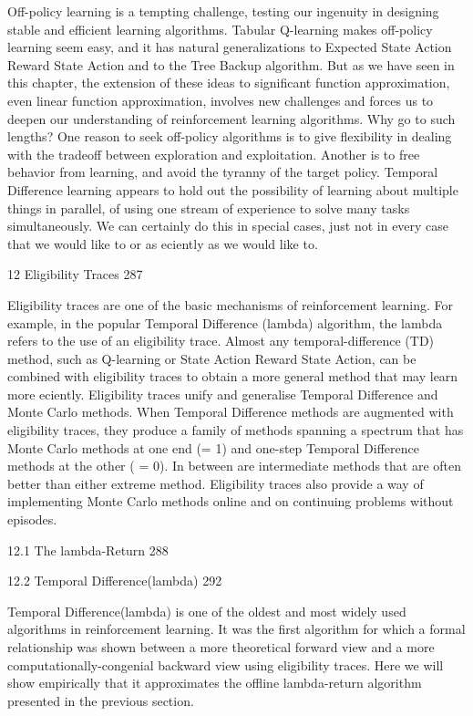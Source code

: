 Off-policy learning is a tempting challenge, testing our ingenuity in designing stable and efficient learning algorithms. Tabular Q-learning makes off-policy learning seem easy, and it has natural generalizations to Expected State Action Reward State Action and to the Tree Backup algorithm. But as we have seen in this chapter, the extension of these ideas to significant function approximation, even linear function approximation, involves new challenges and forces us to deepen our understanding of reinforcement learning algorithms. Why go to such lengths? One reason to seek off-policy algorithms is to give flexibility in dealing with the tradeoff between exploration and exploitation. Another is to free behavior from learning, and avoid the tyranny of the target policy. Temporal Difference learning appears to hold out the possibility of learning about multiple things in parallel, of using one stream of experience to solve many tasks simultaneously. We can certainly do this in special cases, just not in every case that we would like to or as eciently as we would like to.

12 Eligibility Traces 287

Eligibility traces are one of the basic mechanisms of reinforcement learning. For example, in the popular Temporal Difference (lambda) algorithm, the lambda refers to the use of an eligibility trace. Almost any temporal-difference (TD) method, such as Q-learning or State Action Reward State Action, can be combined with eligibility traces to obtain a more general method that may learn more eciently. Eligibility traces unify and generalise Temporal Difference and Monte Carlo methods. When Temporal Difference methods are augmented with eligibility traces, they produce a family of methods spanning a spectrum that has Monte Carlo methods at one end (= 1) and one-step Temporal Difference methods at the other ( = 0). In between are intermediate methods that are often better than either extreme method. Eligibility traces also provide a way of implementing Monte Carlo methods online and on continuing problems without episodes.

12.1 The lambda-Return 288



12.2 Temporal Difference(lambda) 292

Temporal Difference(lambda) is one of the oldest and most widely used algorithms in reinforcement learning. It was the first algorithm for which a formal relationship was shown between a more theoretical forward view and a more computationally-congenial backward view using eligibility traces. Here we will show empirically that it approximates the offline lambda-return algorithm presented in the previous section.

